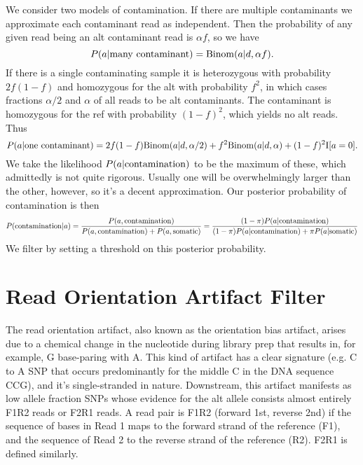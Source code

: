 \documentclass[nofootinbib,amssymb,amsmath]{revtex4}
\begin{document}
We consider two models of contamination.  If there are multiple contaminants we approximate each contaminant read as independent.  Then the probability of any given read being an alt contaminant read is $\alpha f$, so we have
\begin{equation}
P(a | {\rm many~contaminant}) = {\rm Binom}(a | d, \alpha f).
\end{equation}
If there is a single contaminating sample it is heterozygous with probability $2f(1-f)$ and homozygous for the alt with probability $f^2$, in which cases fractions $\alpha/2$ and $\alpha$ of all reads to be alt contaminants.  The contaminant is homozygous for the ref with probability $(1-f)^2$, which yields no alt reads. Thus
\begin{equation}
P(a | {\rm one~contaminant}) = 2f(1-f) {\rm Binom}(a | d, \alpha /2) + f^2 {\rm Binom}(a | d, \alpha) + (1-f)^2 {\rm I}[a = 0].
\end{equation}
We take the likelihood $P(a | {\rm contamination})$ to be the maximum of these, which admittedly is not quite rigorous.  Usually one will be overwhelmingly larger than the other, however, so it's a decent approximation.  Our posterior probability of contamination is then
\begin{equation}
P({\rm contamination} | a) = \frac{  P(a, {\rm contamination}) } {P(a, {\rm contamination}) + P(a, {\rm somatic}) } = \frac{  (1-\pi)P(a | {\rm contamination}) } {(1-\pi)P(a | {\rm contamination}) + \pi P(a | {\rm somatic}) }
\end{equation}
We filter by setting a threshold on this posterior probability.

\section{Read Orientation Artifact Filter}

The read orientation artifact, also known as the orientation bias artifact, arises due to a chemical change in the nucleotide during library prep that results in, for example, G base-paring with A. This kind of artifact has a clear signature (e.g. C to A SNP that occurs predominantly for the middle C in the DNA sequence CCG), and it's single-stranded in nature. Downstream, this artifact manifests as low allele fraction SNPs whose evidence for the alt allele consists almost entirely F1R2 reads or F2R1 reads. A read pair is F1R2 (forward 1st, reverse 2nd) if the sequence of bases in Read 1 maps to the forward strand of the reference (F1), and the sequence of Read 2 to the reverse strand of the reference (R2). F2R1 is defined similarly.
\end{document}
